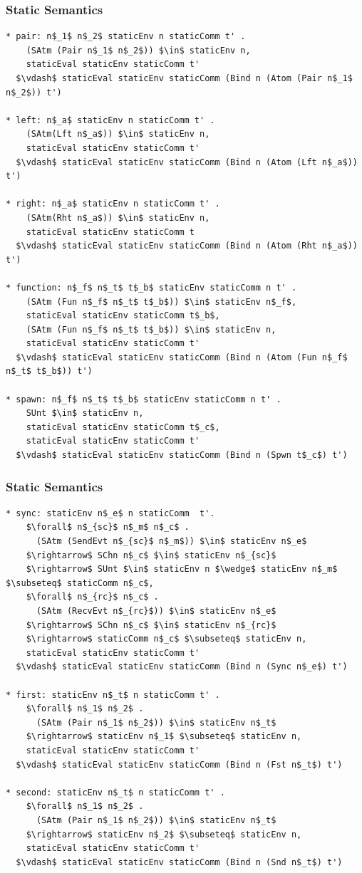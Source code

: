 \documentclass{beamer}
\begin{document}
\begin{frame}[fragile]
	\frametitle{Static Semantics}
\begin{lstlisting}[language=logic, mathescape]
* pair: n$_1$ n$_2$ staticEnv n staticComm t' .
    (SAtm (Pair n$_1$ n$_2$)) $\in$ staticEnv n,
    staticEval staticEnv staticComm t'
  $\vdash$ staticEval staticEnv staticComm (Bind n (Atom (Pair n$_1$ n$_2$)) t')

* left: n$_a$ staticEnv n staticComm t' .
    (SAtm(Lft n$_a$)) $\in$ staticEnv n,
    staticEval staticEnv staticComm t' 
  $\vdash$ staticEval staticEnv staticComm (Bind n (Atom (Lft n$_a$)) t')

* right: n$_a$ staticEnv n staticComm t' .
    (SAtm(Rht n$_a$)) $\in$ staticEnv n, 
    staticEval staticEnv staticComm t
  $\vdash$ staticEval staticEnv staticComm (Bind n (Atom (Rht n$_a$)) t')

* function: n$_f$ n$_t$ t$_b$ staticEnv staticComm n t' .
    (SAtm (Fun n$_f$ n$_t$ t$_b$)) $\in$ staticEnv n$_f$, 
    staticEval staticEnv staticComm t$_b$, 
    (SAtm (Fun n$_f$ n$_t$ t$_b$)) $\in$ staticEnv n, 
    staticEval staticEnv staticComm t'
  $\vdash$ staticEval staticEnv staticComm (Bind n (Atom (Fun n$_f$ n$_t$ t$_b$)) t')

* spawn: n$_f$ n$_t$ t$_b$ staticEnv staticComm n t' .
    SUnt $\in$ staticEnv n, 
    staticEval staticEnv staticComm t$_c$, 
    staticEval staticEnv staticComm t'
  $\vdash$ staticEval staticEnv staticComm (Bind n (Spwn t$_c$) t')
\end{lstlisting}
\end{frame}

\begin{frame}[fragile]
	\frametitle{Static Semantics}
\begin{lstlisting}[language=logic, mathescape]
* sync: staticEnv n$_e$ n staticComm  t'.
    $\forall$ n$_{sc}$ n$_m$ n$_c$ . 
      (SAtm (SendEvt n$_{sc}$ n$_m$)) $\in$ staticEnv n$_e$
    $\rightarrow$ SChn n$_c$ $\in$ staticEnv n$_{sc}$ 
    $\rightarrow$ SUnt $\in$ staticEnv n $\wedge$ staticEnv n$_m$ $\subseteq$ staticComm n$_c$,
    $\forall$ n$_{rc}$ n$_c$ . 
      (SAtm (RecvEvt n$_{rc}$)) $\in$ staticEnv n$_e$
    $\rightarrow$ SChn n$_c$ $\in$ staticEnv n$_{rc}$ 
    $\rightarrow$ staticComm n$_c$ $\subseteq$ staticEnv n,
    staticEval staticEnv staticComm t'
  $\vdash$ staticEval staticEnv staticComm (Bind n (Sync n$_e$) t')

* first: staticEnv n$_t$ n staticComm t' . 
    $\forall$ n$_1$ n$_2$ .
      (SAtm (Pair n$_1$ n$_2$)) $\in$ staticEnv n$_t$
    $\rightarrow$ staticEnv n$_1$ $\subseteq$ staticEnv n,
    staticEval staticEnv staticComm t'
  $\vdash$ staticEval staticEnv staticComm (Bind n (Fst n$_t$) t')

* second: staticEnv n$_t$ n staticComm t' . 
    $\forall$ n$_1$ n$_2$ . 
      (SAtm (Pair n$_1$ n$_2$)) $\in$ staticEnv n$_t$
    $\rightarrow$ staticEnv n$_2$ $\subseteq$ staticEnv n,
    staticEval staticEnv staticComm t'
  $\vdash$ staticEval staticEnv staticComm (Bind n (Snd n$_t$) t')

\end{lstlisting}
\end{frame}
\end{document}
